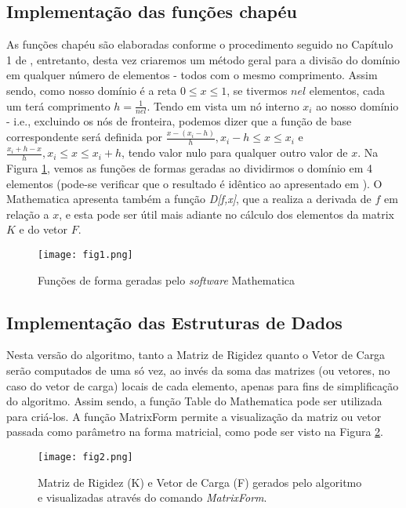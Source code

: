 \documentclass[11pt, oneside]{article}   	%
\begin{document}
\subsection{Implementação das funções chapéu}
As funções chapéu são elaboradas conforme o procedimento seguido no Capítulo 1 de \citet{oden81}, entretanto, desta vez criaremos um método geral para a divisão do domínio em qualquer número de elementos - todos com o mesmo comprimento. Assim sendo, como nosso domínio é a reta $0\leq x \leq1$, se tivermos $nel$ elementos, cada um terá comprimento $h=\frac{1}{nel}$. Tendo em vista um nó interno $x_{i}$ ao nosso domínio - i.e., excluindo os nós de fronteira, podemos dizer que a função de base correspondente será definida por $\frac{x-(x_{i}-h)}{h},x_{i}-h \leq x\leq x_{i}$ e $\frac{x_{i}+h-x}{h},x_{i}\leq x \leq x_{i}+h$, tendo valor nulo para qualquer outro valor de $x$. Na Figura \ref{fig:Funcoes-de-forma-Math-1}, vemos as funções de formas geradas ao dividirmos o domínio em 4 elementos (pode-se verificar que o resultado é idêntico ao apresentado em \citet{oden81}). O Mathematica apresenta também a função \emph{D[f,x]}, que a realiza a derivada de $f$ em relação a $x$, e esta pode ser útil mais adiante no cálculo dos elementos da matrix $K$ e do vetor $F$.
\begin{figure}[h!]
  \centering
      \texttt{[image: fig1.png]}
  \caption{Funções de forma geradas pelo \emph{software} Mathematica}
  \label{fig:Funcoes-de-forma-Math-1}
\end{figure}

\subsection{Implementação das Estruturas de Dados}
Nesta versão do algoritmo, tanto a Matriz de Rigidez quanto o Vetor de Carga serão computados de uma só vez, ao invés da soma das matrizes (ou vetores, no caso do vetor de carga) locais de cada elemento, apenas para fins de simplificação do algoritmo. Assim sendo, a função Table do Mathematica pode ser utilizada para criá-los. A função MatrixForm permite a visualização da matriz ou vetor passada como parâmetro na forma matricial, como pode ser visto na Figura \ref{fig:math1matriz}.
\begin{figure}[h!]
  \centering
      \texttt{[image: fig2.png]}
  \caption{Matriz de Rigidez (K) e Vetor de Carga (F) gerados pelo algoritmo e visualizadas através do comando \emph{MatrixForm}.}
  \label{fig:math1matriz}
\end{figure}
\end{document}
